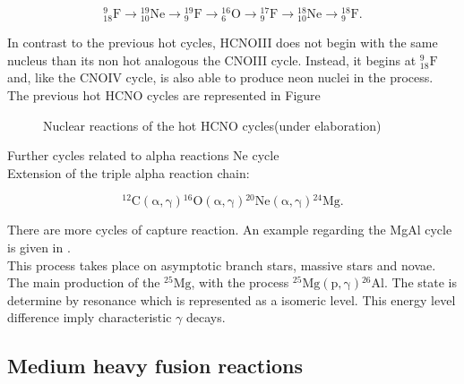 \documentclass[openany]{book}
\begin{document}
\begin{equation} \label{eq:reaction_HCNO_O}
	\mathrm{{}_{18}^{9}F  \rightarrow {}^{19}_{10}Ne  \rightarrow {}^{19}_{9}F  \rightarrow {}^{16}_{6}O  \rightarrow {}^{17}_{9}F  \rightarrow {}^{18}_{10}Ne \rightarrow {}^{18}_{9}F  }.
\end{equation}

In contrast to the previous hot cycles, HCNOIII does not begin with the same nucleus than its non hot analogous the CNOIII cycle. Instead, it begins at $\mathrm{{}_{18}^{9}F}$ and, like the CNOIV cycle, is also able to produce neon nuclei in the process. \\

The previous hot HCNO cycles are represented in Figure 

\begin{figure}[H]
	
	\caption[Nuclear reactions of the HCNO cycles ]{Nuclear reactions of the hot HCNO cycles(under elaboration)}
	\label{fig:nuclerReactionppHCNO}
\end{figure}

Further cycles related to alpha reactions Ne cycle \cite{kaeppeler_wiescher_giesen_goerres_baraffe_eleid_raiteri_busso_gallino_limongi_et_1994}\\

Extension of the triple alpha reaction chain:

\begin{equation}\label{eq:reaction_4chain}
	\mathrm{{}^{12}C(\alpha, \gamma){}^{16}O(\alpha, \gamma){}^{20}Ne(\alpha, \gamma){}^{24}Mg.}
\end{equation}


There are more cycles of capture reaction. An example regarding the MgAl cycle is given in \cite{lotay_doherty_janssens_seweryniak_albers_almaraz-calderon_carpenter_champagne_chiara_hoffman_et_2022}. \\

This process takes place on asymptotic branch stars, massive stars and novae. The main production of the $\mathrm{{}^{25}Mg}$, with the process $\mathrm{{}^{25}Mg(p, \gamma){}^{26}Al}$. The state is determine by resonance which is represented as a isomeric level. This energy level difference imply characteristic $\gamma$ decays. \\

\subsection{Medium heavy fusion reactions} \label{sub:mediumHeavyReactions}
\end{document}
